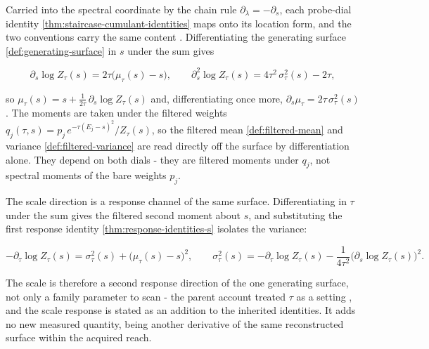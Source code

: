Carried into the spectral coordinate by the chain rule $\partial_\lambda=-\partial_s$, each probe-dial identity \eqref{thm:staircase-cumulant-identities} maps onto its location form, and the two conventions carry the same content \cite{mccaul2025snacks}. Differentiating the generating surface \eqref{def:generating-surface} in $s$ under the sum gives
\begin{widetext}
\begin{equation}\label{thm:response-identities-s}
\partial_s\log Z_\tau(s)=2\tau\bigl(\mu_\tau(s)-s\bigr),\qquad \partial_s^{2}\log Z_\tau(s)=4\tau^{2}\,\sigma_\tau^{2}(s)-2\tau,
\end{equation}
\end{widetext}
so $\mu_\tau(s)=s+\tfrac{1}{2\tau}\,\partial_s\log Z_\tau(s)$ and, differentiating once more, $\partial_s\mu_\tau=2\tau\,\sigma_\tau^{2}(s)$. The moments are taken under the filtered weights $q_j(\tau,s)=p_j\,e^{-\tau(E_j-s)^{2}}/Z_\tau(s)$, so the filtered mean \eqref{def:filtered-mean} and variance \eqref{def:filtered-variance} are read directly off the surface by differentiation alone. They depend on both dials - they are filtered moments under $q_j$, not spectral moments of the bare weights $p_j$.

The scale direction is a response channel of the same surface. Differentiating in $\tau$ under the sum gives the filtered second moment about $s$, and substituting the first response identity \eqref{thm:response-identities-s} isolates the variance:
\begin{widetext}
\begin{equation}\label{res:tau-direction-response}
-\partial_\tau\log Z_\tau(s)=\sigma_\tau^{2}(s)+\bigl(\mu_\tau(s)-s\bigr)^{2},\qquad \sigma_\tau^{2}(s)=-\partial_\tau\log Z_\tau(s)-\frac{1}{4\tau^{2}}\bigl(\partial_s\log Z_\tau(s)\bigr)^{2}.
\end{equation}
\end{widetext}
The scale is therefore a second response direction of the one generating surface, not only a family parameter to scan - the parent account treated $\tau$ as a setting \cite{mccaul2025snacks}, and the scale response is stated as an addition to the inherited identities. It adds no new measured quantity, being another derivative of the same reconstructed surface within the acquired reach.

